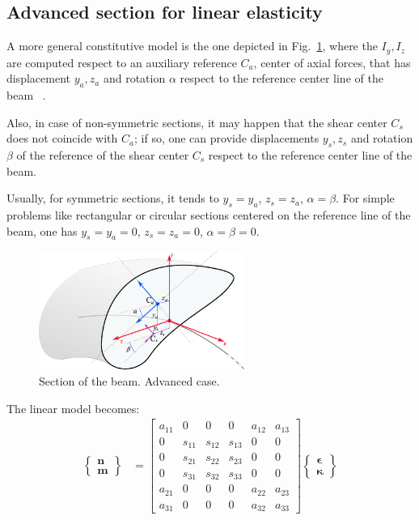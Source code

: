 \documentclass[review]{elsarticle}
\def\avect#1{{\boldsymbol{#1}}}
\begin{document}
\subsection{Advanced section for linear elasticity}
\label{sec:advanced}

A more general constitutive model is the one depicted in Fig.~\ref{fig:section_advanced}, where the $I_y, I_z$ are computed respect to an auxiliary reference $C_a$, center of axial forces, that has displacement $y_a, z_a$ and rotation $\alpha$ respect to the reference center line of the beam~\cite{MASARATI-2014-IJSS} .

Also, in case of non-symmetric sections, it may happen that the shear center $C_s$ does not coincide with $C_a$; if so, one can provide displacements $y_s, z_s$ and rotation $\beta$ of the reference of the shear center $C_s$ respect to the reference center line of the beam. 

Usually, for symmetric sections, it tends to $y_s=y_a$, $z_s=z_a$, $\alpha=\beta$. For simple problems like rectangular or circular sections centered on the reference line of the beam, one has $y_s=y_a=0$, $z_s=z_a=0$, $\alpha=\beta=0$.

\begin{figure}[ht]
    \centering
    \includegraphics[width=0.60\textwidth]{section_beam_advanced.pdf}
    \caption{Section of the beam. Advanced case.}
    \label{fig:section_advanced}
\end{figure}

The linear model becomes:
%
\begin{align}
\left\{  
	\begin{array}{c}
	 \avect{n} \\
	 \avect{m} 
	\end{array}
	\right\}
	&= 
	\left[  
	\begin{array}{cccccc}
	 a_{11} & 0 & 0 & 0 & a_{12} & a_{13} \\
	 0      & s_{11} & s_{12} & s_{13} & 0 & 0 \\
	 0      & s_{21} & s_{22} & s_{23} & 0 & 0 \\
	 0      & s_{31} & s_{32} & s_{33} & 0 & 0 \\
	 a_{21} & 0      & 0      & 0      & a_{22} & a_{23} \\
	 a_{31} & 0      & 0      & 0      & a_{32} & a_{33}
	\end{array}
	\right]
	\left\{  
	\begin{array}{c}
	 \avect{\epsilon} \\
	 \avect{\kappa}
	\end{array}
	\right\}
\end{align}
\end{document}
